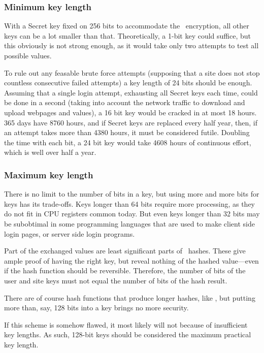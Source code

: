 \subsubsection{Minimum key length}
With a Secret key fixed on 256 bits to accommodate the \AES\ encryption,
all other keys can be a lot smaller than that.
Theoretically,
a 1-bit key could suffice,
but this obviously is not strong enough,
as it would take only two attempts to test all possible values.
\par
To rule out any feasable brute force attempts
(supposing that a site does not stop countless consecutive failed attempts)
a key length of 24 bits should be enough.
Assuming that a single login attempt,
exhausting all Secret keys each time,
could be done in a second
(taking into account the network traffic to download and upload webpages and values),
a 16 bit key would be cracked in at most 18 hours.
365 days have 8760 hours,
and if Secret keys are replaced every half year,
then,
if an attempt takes more than 4380 hours,
it must be considered futile.
Doubling the time with each bit,
a 24 bit key would take 4608 hours of continuous effort,
which is well over half a year.

\subsubsection{Maximum key length}
There is no limit to the number of bits in a key,
but using more and more bits for keys has its trade-offs.
Keys longer than 64 bits require more processing,
as they do not fit in CPU registers common today.
But even keys longer than 32 bits may be subobtimal in some programming languages that are used to make client side login pages,
or server side login programs.
\par
Part of the exchanged values are least significant parts of \SHA\ hashes.
These give ample proof of having the right key,
but reveal nothing of the hashed value---even if the hash function should be reversible.
Therefore,
the number of bits of the user and site keys must not equal the number of bits of the hash result.
\par
There are of course hash functions that produce longer hashes,
like ,
but putting more than,
say,
128 bits into a key brings no more security.
\par
If this scheme is somehow flawed,
it most likely will not because of insufficient key lengths.
As such,
128-bit keys should be considered the maximum practical key length.

